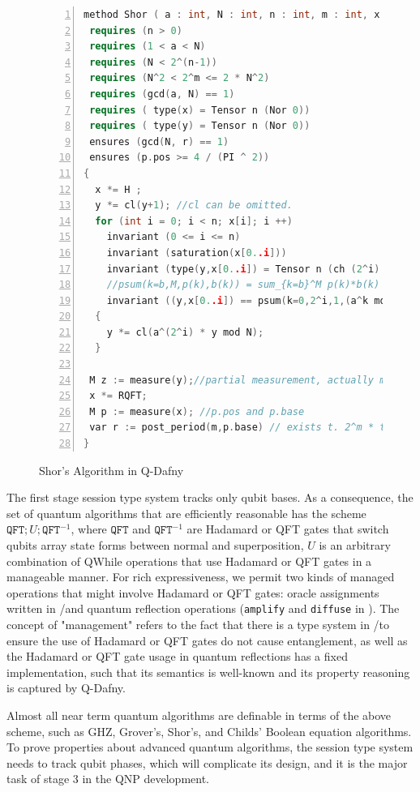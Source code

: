\begin{figure}[t]
{\small
  \begin{lstlisting}[numbers=left,language=C++,xleftmargin=4 mm]
method Shor ( a : int, N : int, n : int, m : int, x : Q[n], y : Q[n] )
 requires (n > 0)
 requires (1 < a < N)
 requires (N < 2^(n-1))
 requires (N^2 < 2^m <= 2 * N^2)
 requires (gcd(a, N) == 1)
 requires ( type(x) = Tensor n (Nor 0))
 requires ( type(y) = Tensor n (Nor 0))
 ensures (gcd(N, r) == 1)
 ensures (p.pos >= 4 / (PI ^ 2))
{
  x *= H ;
  y *= cl(y+1); //cl can be omitted.
  for (int i = 0; i < n; x[i]; i ++)
    invariant (0 <= i <= n)
    invariant (saturation(x[0..i]))
    invariant (type(y,x[0..i]) = Tensor n (ch (2^i) {k | j baseof x[0..i] && k = (a^j mod N,j)}))
    //psum(k=b,M,p(k),b(k)) = sum_{k=b}^M p(k)*b(k)
    invariant ((y,x[0..i]) == psum(k=0,2^i,1,(a^k mod N,k))) 
  {
    y *= cl(a^(2^i) * y mod N);
  }

 M z := measure(y);//partial measurement, actually measure(y,r) r is the period
 x *= RQFT;
 M p := measure(x); //p.pos and p.base
 var r := post_period(m,p.base) // exists t. 2^m * t / r = p.base
}
  \end{lstlisting}
}
\caption{Shor's Algorithm in Q-Dafny}
\label{fig:shorexample}
\end{figure}


The first stage session type system tracks only qubit bases.
As a consequence, the set of quantum algorithms that are efficiently reasonable has the scheme $\texttt{QFT};U;\texttt{QFT}^{-1}$,
where $\texttt{QFT}$ and $\texttt{QFT}^{-1}$ are Hadamard or QFT gates that switch qubits array state forms between normal and superposition, $U$ is an arbitrary combination of QWhile operations that use Hadamard or QFT gates in a manageable manner.
For rich expressiveness, we permit two kinds of managed operations that might involve Hadamard or QFT gates: 
oracle assignments written in \oqasm/\sourcelang and quantum reflection operations (\texttt{amplify} and \texttt{diffuse} in ).
The concept of "management" refers to the fact that there is a type system in \oqasm/\sourcelang to ensure the use of Hadamard or QFT gates do not cause entanglement, as well as the Hadamard or QFT gate usage in quantum reflections has a fixed implementation, such that its semantics is well-known and its property reasoning is captured by Q-Dafny.

Almost all near term quantum algorithms are definable in terms of the above scheme, such as GHZ, Grover's, Shor's, and Childs' Boolean equation algorithms.
To prove properties about advanced quantum algorithms, the session type system needs to track qubit phases, which will complicate its design, and it is the major task of stage 3 in the QNP development.


















